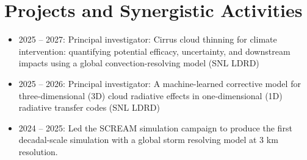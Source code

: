 \documentclass[10pt]{article}
\begin{document}
\section*{Projects and Synergistic Activities}
\begin{itemize}
    \item 2025 -- 2027: Principal investigator: Cirrus cloud thinning for climate intervention: quantifying potential efficacy, uncertainty, and downstream impacts using a global convection-resolving model (SNL LDRD)
    \item 2025 -- 2026: Principal investigator: A machine-learned corrective model for three-dimensional (3D) cloud radiative effects in one-dimensional (1D) radiative transfer codes (SNL LDRD)
    \item 2024 -- 2025: Led the SCREAM simulation campaign to produce the first decadal-scale simulation with a global storm resolving model at 3 km resolution.
\end{itemize}

\renewcommand\refname{Publications}
\nocite{*}

\end{document}
